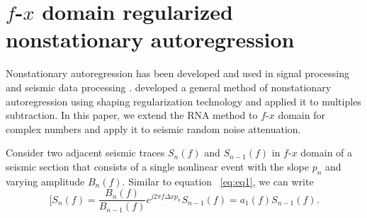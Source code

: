 \section{$f$-$x$ domain regularized nonstationary autoregression}

Nonstationary autoregression has been developed and used in signal processing 
\cite[]{Bakrim1994, Aboutajdine1996, Izquierdo2006} and seismic data processing
\cite[]{Sacchi2009}. \cite{Fomel2009} developed a general method of nonstationary 
autoregression using shaping regularization technology and applied it to multiples
 subtraction. In this paper, we extend the RNA method to $f$-$x$ domain for complex numbers 
and apply it to seismic random noise attenuation. 

Consider two adjacent seismic traces ${{S}_{n}}(f)$ and ${{S}_{n-1}}(f)$ in 
$f$-$x$ domain of a seismic section that consists of a single nonlinear event with the 
slope ${{p}_{n}}$ and varying amplitude ${{B}_{n}}(f)$. Similar to equation ~\ref{eq:eq1}, 
we can write
      \begin{equation}
          [{{S}_{n}}(f)=\frac{{{B}_{n}}(f)}{{{B}_{n-1}}(f)}{{e}^{j2\pi f\Delta x{{p}_{n}}}}{{S}_{n-1}}(f)={{a}_{1}}(f){{S}_{n-1}}(f).
        \label{eq:eq5}
      \end{equation}
 
